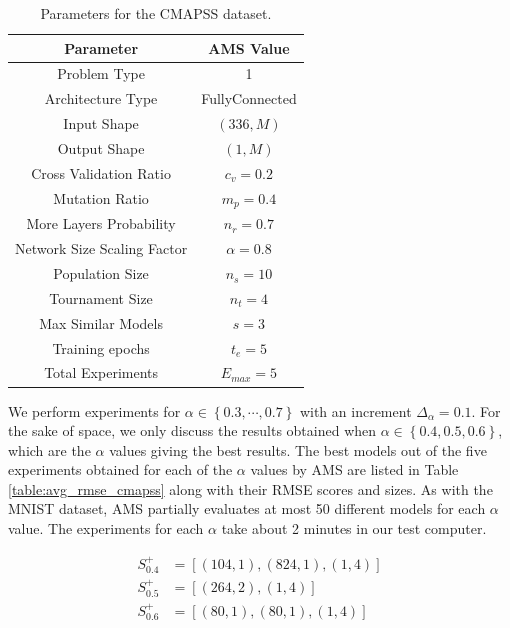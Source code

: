 \documentclass[12pt]{elsart}%
\begin{document}
\begin{table}[!htb]
\begin{center}
\caption{Parameters for the CMAPSS dataset.}
\label{table:CMAPSS_params}
\vspace{12pt}
\begin{tabular}{| c | c |}
\hline
Parameter & AMS Value \\
\hline
Problem Type & 1 \\
Architecture Type & FullyConnected \\
Input Shape & $(336, M)$  \\
Output Shape & $(1, M)$ \\
Cross Validation Ratio & $c_v = 0.2$ \\
Mutation Ratio & $m_p = 0.4$ \\
More Layers Probability & $n_r = 0.7$ \\
Network Size Scaling Factor & $\alpha = 0.8$ \\
Population Size & $n_s = 10$ \\
Tournament Size & $n_t = 4$ \\
Max Similar Models & $s = 3$ \\
Training epochs & $t_e = 5$\\
Total Experiments & $E_{max} = 5$ \\
\hline
\end{tabular}
\end{center}
\end{table}

We perform experiments for $\alpha \in \left\lbrace 0.3, \cdots, 0.7 \right\rbrace$ with an increment $\Delta_\alpha = 0.1$. For the sake of space, we only discuss the results obtained when $\alpha \in \left\lbrace 0.4, 0.5, 0.6 \right\rbrace$, which are the $\alpha$ values giving the best results. The best models out of the five experiments obtained for each of the $\alpha$ values by AMS are listed in Table \ref{table:avg_rmse_cmapss} along with their RMSE scores and sizes. As with the MNIST dataset, AMS partially evaluates at most 50 different models for each $\alpha$ value. The experiments for each $\alpha$ take about 2 minutes in our test computer.

\begin{align*}
S^+_{0.4} & = \left[ (104, 1), (824, 1), (1, 4) \right] \\
S^+_{0.5} & = \left[ (264, 2), (1, 4) \right] \\
S^+_{0.6} & = \left[ (80, 1), (80, 1), (1, 4) \right] \\
\end{align*}
\end{document}
